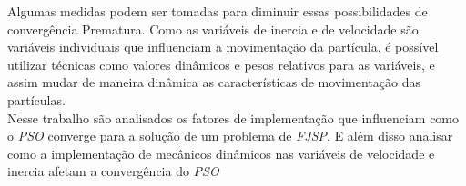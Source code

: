 Algumas medidas podem ser tomadas para diminuir essas possibilidades de convergência Prematura.
Como as variáveis de inercia e de velocidade são variáveis individuais que influenciam a movimentação da partícula, é possível utilizar técnicas como valores dinâmicos e pesos relativos para as variáveis, e assim mudar de maneira dinâmica as características de movimentação das partículas.\\

Nesse trabalho são analisados os fatores de implementação que influenciam como o \textit{PSO} converge para a solução de um problema de \textit{FJSP}.
E além disso analisar como a implementação de mecânicos dinâmicos nas variáveis de velocidade e inercia afetam a convergência do \textit{PSO}


